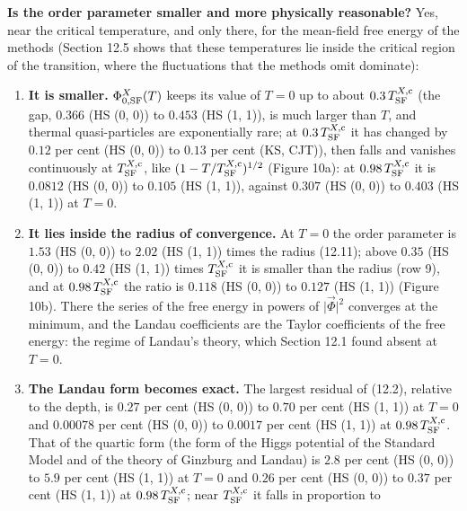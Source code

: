 \documentclass[
  10pt,
]{article}
\providecommand{\tightlist}{%
  \setlength{\itemsep}{0pt}\setlength{\parskip}{0pt}}
\begin{document}
\textbf{Is the order parameter smaller and more physically reasonable?}
Yes, near the critical temperature, and only there, for the mean-field
free energy of the methods (Section 12.5 shows that these temperatures
lie inside the critical region of the transition, where the fluctuations
that the methods omit dominate):

\begin{enumerate}
\def\labelenumi{\arabic{enumi}.}
\tightlist
\item
  \textbf{It is smaller.} \(\Phi^X_{0,{\rm SF}}(T)\) keeps its value of
  \(T=0\) up to about \(0.3\,T^{X,{\rm c}}_{\rm SF}\) (the gap,
  \(0.366\) (HS (0, 0)) to \(0.453\) (HS (1, 1)), is much larger than
  \(T\), and thermal quasi-particles are exponentially rare; at
  \(0.3\,T^{X,{\rm c}}_{\rm SF}\) it has changed by \(0.12\) per cent
  (HS (0, 0)) to \(0.13\) per cent (KS, CJT)), then falls and vanishes
  continuously at \(T^{X,{\rm c}}_{\rm SF}\), like
  \((1-T/T^{X,{\rm c}}_{\rm SF})^{1/2}\) (Figure 10a): at
  \(0.98\,T^{X,{\rm c}}_{\rm SF}\) it is \(0.0812\) (HS (0, 0)) to
  \(0.105\) (HS (1, 1)), against \(0.307\) (HS (0, 0)) to \(0.403\) (HS
  (1, 1)) at \(T=0\).
\item
  \textbf{It lies inside the radius of convergence.} At \(T=0\) the
  order parameter is \(1.53\) (HS (0, 0)) to \(2.02\) (HS (1, 1)) times
  the radius (12.11); above \(0.35\) (HS (0, 0)) to \(0.42\) (HS (1, 1))
  times \(T^{X,{\rm c}}_{\rm SF}\) it is smaller than the radius (row
  9), and at \(0.98\,T^{X,{\rm c}}_{\rm SF}\) the ratio is \(0.118\) (HS
  (0, 0)) to \(0.127\) (HS (1, 1)) (Figure 10b). There the series of the
  free energy in powers of \(\lvert\vec\Phi\rvert^2\) converges at the
  minimum, and the Landau coefficients are the Taylor coefficients of
  the free energy: the regime of Landau's theory, which Section 12.1
  found absent at \(T=0\).
\item
  \textbf{The Landau form becomes exact.} The largest residual of
  (12.2), relative to the depth, is \(0.27\) per cent (HS (0, 0)) to
  \(0.70\) per cent (HS (1, 1)) at \(T=0\) and \(0.00078\) per cent (HS
  (0, 0)) to \(0.0017\) per cent (HS (1, 1)) at
  \(0.98\,T^{X,{\rm c}}_{\rm SF}\). That of the quartic form (the form
  of the Higgs potential of the Standard Model and of the theory of
  Ginzburg and Landau) is \(2.8\) per cent (HS (0, 0)) to \(5.9\) per
  cent (HS (1, 1)) at \(T=0\) and \(0.26\) per cent (HS (0, 0)) to
  \(0.37\) per cent (HS (1, 1)) at \(0.98\,T^{X,{\rm c}}_{\rm SF}\);
  near \(T^{X,{\rm c}}_{\rm SF}\) it falls in proportion to

\end{enumerate}
\end{document}
